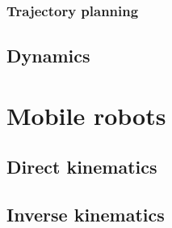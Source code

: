 \documentclass{article}
\begin{document}
	\subsubsection{Trajectory planning}
	
	\subsection{Dynamics}
	
	\section{Mobile robots}
	\subsection{Direct kinematics}
	\subsection{Inverse kinematics}
\end{document}
